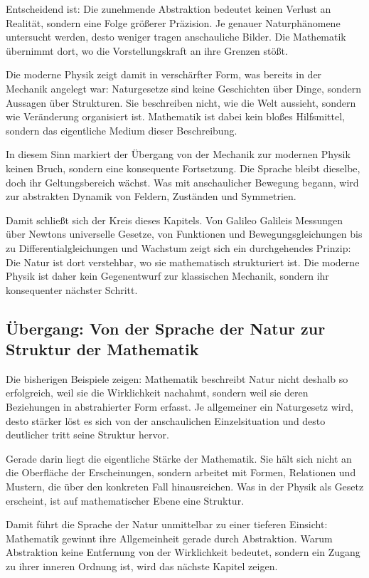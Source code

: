 Entscheidend ist:
Die zunehmende Abstraktion
bedeutet keinen Verlust an Realität,
sondern eine Folge größerer Präzision.
Je genauer Naturphänomene untersucht werden,
desto weniger tragen anschauliche Bilder.
Die Mathematik
übernimmt dort,
wo die Vorstellungskraft an ihre Grenzen stößt.

Die moderne Physik zeigt damit in verschärfter Form,
was bereits in der Mechanik angelegt war:
Naturgesetze
sind keine Geschichten über Dinge,
sondern Aussagen über Strukturen.
Sie beschreiben nicht,
wie die Welt aussieht,
sondern wie Veränderung organisiert ist.
Mathematik ist dabei kein bloßes Hilfsmittel,
sondern das eigentliche Medium dieser Beschreibung.

In diesem Sinn markiert der Übergang von der Mechanik zur modernen Physik keinen Bruch,
sondern eine konsequente Fortsetzung.
Die Sprache bleibt dieselbe,
doch ihr Geltungsbereich wächst.
Was mit anschaulicher Bewegung begann,
wird zur abstrakten Dynamik
von Feldern, Zuständen und Symmetrien.

Damit schließt sich der Kreis dieses Kapitels.
Von Galileo Galileis Messungen
über Newtons universelle Gesetze,
von Funktionen
und Bewegungsgleichungen
bis zu Differentialgleichungen und Wachstum
zeigt sich ein durchgehendes Prinzip:
Die Natur ist dort verstehbar,
wo sie mathematisch strukturiert ist.
Die moderne Physik ist daher kein Gegenentwurf zur klassischen Mechanik,
sondern ihr konsequenter nächster Schritt.

\subsection*{Übergang: Von der Sprache der Natur zur Struktur der Mathematik}

Die bisherigen Beispiele zeigen:
Mathematik beschreibt Natur nicht deshalb so erfolgreich,
weil sie die Wirklichkeit nachahmt,
sondern weil sie deren Beziehungen in abstrahierter Form erfasst.
Je allgemeiner ein Naturgesetz wird,
desto stärker löst es sich von der anschaulichen Einzelsituation
und desto deutlicher tritt seine Struktur hervor.

Gerade darin liegt die eigentliche Stärke der Mathematik.
Sie hält sich nicht an die Oberfläche der Erscheinungen,
sondern arbeitet mit Formen, Relationen und Mustern,
die über den konkreten Fall hinausreichen.
Was in der Physik als Gesetz erscheint,
ist auf mathematischer Ebene eine Struktur.

Damit führt die Sprache der Natur unmittelbar
zu einer tieferen Einsicht:
Mathematik gewinnt ihre Allgemeinheit
gerade durch Abstraktion.
Warum Abstraktion keine Entfernung von der Wirklichkeit bedeutet,
sondern ein Zugang zu ihrer inneren Ordnung ist,
wird das nächste Kapitel zeigen.